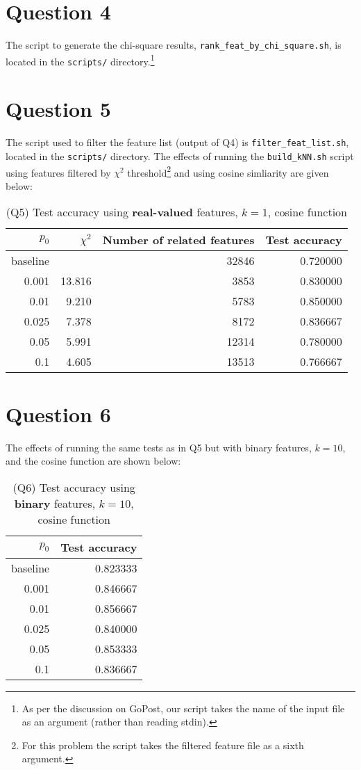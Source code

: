 \documentclass[oneside,justified,marginals=raggedouter]{tufte-handout}
\begin{document}
\section{Question 4}

The script to generate the chi-square results,
\texttt{\small rank\_feat\_by\_chi\_square.sh}, is located in the \texttt{\small scripts/}
directory.\footnote{As per the discussion on GoPost, our script takes
the name of the input file as an argument (rather than reading stdin).}

\section{Question 5}

The script used to filter the feature list (output of Q4) is \texttt{\small filter\_feat\_list.sh}, located in the
\texttt{\small scripts/} directory. The effects of running the \texttt{\small build\_kNN.sh} script using
features filtered by $\chi^2$ threshold\footnote{For
this problem the script takes the filtered feature file as a sixth
argument.} and using cosine simliarity are given below:


\begin{table}
\begin{tabular}{@{}rrrr@{}}
\toprule
$p_0$ & $\chi^2$ & Number of related features & Test accuracy \\ \midrule
baseline &         & 32846 & 0.720000 \\
0.001    & 13.816  & 3853  & 0.830000 \\
0.01     & 9.210   & 5783  & 0.850000 \\
0.025    & 7.378   & 8172  & 0.836667 \\
0.05     & 5.991   & 12314 & 0.780000 \\
0.1      & 4.605   & 13513 & 0.766667 \\
\bottomrule
\end{tabular}
\caption{(Q5) Test accuracy using {\bf real-valued} features, {\bf $k=1$},
cosine function}
\end{table}


\section{Question 6}

The effects of running the same tests as in Q5 but with binary features,
$k=10$, and the cosine function are shown below:

\begin{table}
\begin{tabular}{@{}rr@{}}
\toprule
$p_0$ & Test accuracy \\ \midrule
baseline & 0.823333 \\
0.001    & 0.846667 \\
0.01     & 0.856667 \\
0.025    & 0.840000 \\
0.05     & 0.853333 \\
0.1      & 0.836667 \\
\bottomrule
\end{tabular}
\caption{(Q6) Test accuracy using {\bf binary} features, {\bf $k=10$},
cosine function}
\end{table}
\end{document}
